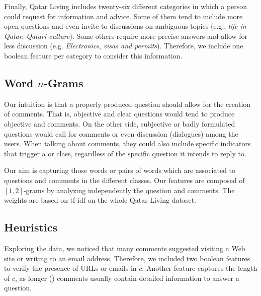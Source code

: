 Finally, Qatar Living includes twenty-six different categories in which a person 
could 
request for information and advice. Some of them tend to include more open 
questions and even invite to discussions on ambiguous topics (e.g., \textit{life 
in Qatar}, \textit{Qatari culture}). Some others require more precise answers 
and allow for less discussion (e.g. \textit{Electronics}, \textit{visas and 
permits}). Therefore, we include one boolean feature per category to consider 
this information. 
 
\subsection{Word $n$-Grams}
\label{ssub:ngrams}

Our intuition is that a properly produced question should allow for the creation 
of \good comments. That is, objective and clear questions would tend to produce 
objective and \good comments. On the other side, subjective or badly formulated 
questions would call for \bad comments or even discussion (\ie dialogues) among 
the users. When talking about comments, they could also include 
specific indicators that trigger a \good or \bad class, regardless of the 
specific question it intends to reply to. 

Our aim is capturing those words or pairs of words which are associated to 
questions and comments in the different classes. Our features are composed of 
$[1,2]$-grams by analyzing independently the question and comments. The weights 
are based on tf-idf on the whole Qatar Living dataset. 

\subsection{Heuristics}
\label{ssub:heuristics}

Exploring the data, we noticed that many \good comments suggested visiting a Web 
site or writing to an email address. Therefore, we included two boolean features 
to verify the presence of URLs or emails in $c$. Another feature captures the 
length of $c$, as longer (\good) comments usually contain detailed information 
to answer a question. 



